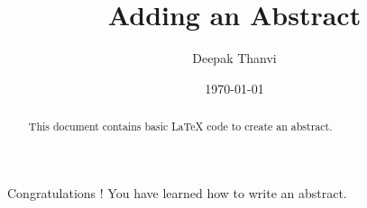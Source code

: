\documentclass{article}
\title{Adding an Abstract}
\author{Deepak Thanvi}
\date{\today}
\begin{document}
\begin{abstract}

This document contains basic LaTeX code to create an abstract.

\end{abstract}

\maketitle

Congratulations ! You have learned how to write an abstract.
\end{document}
